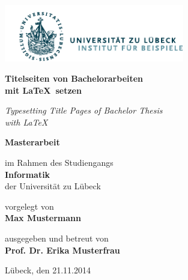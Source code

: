 \documentclass{scrbook}
\begin{document}
\begin{titlepage}
  \includegraphics[height=25mm]{beispiel-logo.pdf}
  
  \vspace{2.5cm}\LARGE
  \textbf{\sffamily\color{maincolor}Titelseiten von Bachelorarbeiten\\
    mit \LaTeX\ setzen}

  \textit{Typesetting Title Pages of Bachelor Thesis\\
    with \LaTeX}

  \normalfont\normalsize\vspace{2em}
  \textbf{\sffamily\color{maincolor}Masterarbeit}

  im Rahmen des Studiengangs \\
  \textbf{\sffamily\color{maincolor}Informatik} \\
  der Universität zu Lübeck

  \vspace{1em}
  vorgelegt von \\
  \textbf{\sffamily\color{maincolor}Max Mustermann}

  \vspace{1em}
  ausgegeben und betreut von \\
  \textbf{\sffamily\color{maincolor}Prof. Dr. Erika Musterfrau}

  \vfill Lübeck, den 21.11.2014
\end{titlepage}
\end{document}
